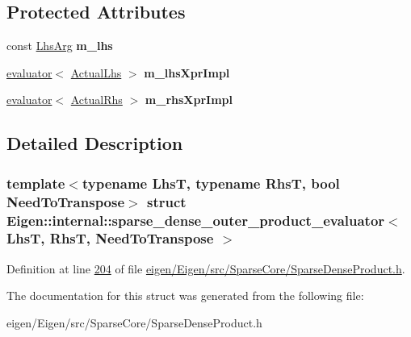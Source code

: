 \subsection*{Protected Attributes}
\begin{DoxyCompactItemize}
\item 
\mbox{\label{struct_eigen_1_1internal_1_1sparse__dense__outer__product__evaluator_ab179fb4ff41a981500a9f1e09a1a36ea}} 
const \hyperlink{class_eigen_1_1internal_1_1_tensor_lazy_evaluator_writable}{Lhs\+Arg} {\bfseries m\+\_\+lhs}
\item 
\mbox{\label{struct_eigen_1_1internal_1_1sparse__dense__outer__product__evaluator_aedcde3259dbb91f6befbe5536a14bf29}} 
\hyperlink{struct_eigen_1_1internal_1_1evaluator}{evaluator}$<$ \hyperlink{class_eigen_1_1internal_1_1_tensor_lazy_evaluator_writable}{Actual\+Lhs} $>$ {\bfseries m\+\_\+lhs\+Xpr\+Impl}
\item 
\mbox{\label{struct_eigen_1_1internal_1_1sparse__dense__outer__product__evaluator_a40ad717a4f96eb5cb361d9e98947bebd}} 
\hyperlink{struct_eigen_1_1internal_1_1evaluator}{evaluator}$<$ \hyperlink{class_eigen_1_1internal_1_1_tensor_lazy_evaluator_writable}{Actual\+Rhs} $>$ {\bfseries m\+\_\+rhs\+Xpr\+Impl}
\end{DoxyCompactItemize}


\subsection{Detailed Description}
\subsubsection*{template$<$typename LhsT, typename RhsT, bool Need\+To\+Transpose$>$\newline
struct Eigen\+::internal\+::sparse\+\_\+dense\+\_\+outer\+\_\+product\+\_\+evaluator$<$ Lhs\+T, Rhs\+T, Need\+To\+Transpose $>$}



Definition at line \hyperlink{eigen_2_eigen_2src_2_sparse_core_2_sparse_dense_product_8h_source_l00204}{204} of file \hyperlink{eigen_2_eigen_2src_2_sparse_core_2_sparse_dense_product_8h_source}{eigen/\+Eigen/src/\+Sparse\+Core/\+Sparse\+Dense\+Product.\+h}.



The documentation for this struct was generated from the following file\+:\begin{DoxyCompactItemize}
\item 
eigen/\+Eigen/src/\+Sparse\+Core/\+Sparse\+Dense\+Product.\+h\end{DoxyCompactItemize}
